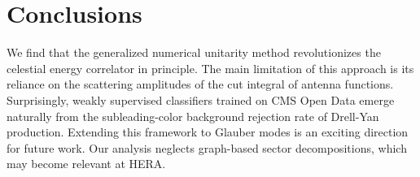 \section{Conclusions}\label{sec:conclusions}

We find that the generalized numerical unitarity method revolutionizes
the celestial energy correlator in principle. The main limitation of
this approach is its reliance on the scattering amplitudes of the cut
integral of antenna functions. Surprisingly, weakly supervised
classifiers trained on CMS Open Data emerge naturally from the
subleading-color background rejection rate of Drell-Yan production.
Extending this framework to Glauber modes is an exciting direction for
future work. Our analysis neglects graph-based sector decompositions,
which may become relevant at HERA.

